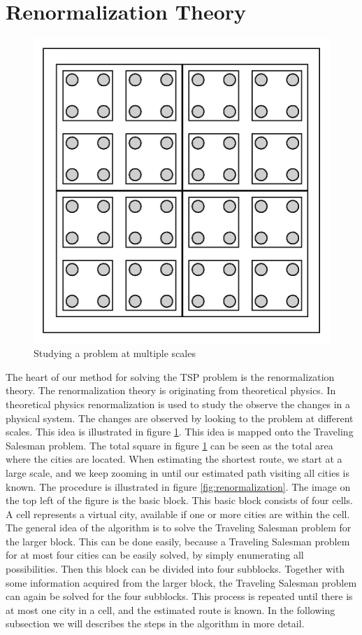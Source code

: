 \section{Renormalization Theory}
\begin{figure}[b]
\begin{center}
\includegraphics[scale=0.2]{fig/ising.png}
\caption{Studying a problem at multiple scales}
\label{fig:scales}
\end{center}
\end{figure}
The heart of our method for solving the TSP problem is the renormalization theory. The renormalization theory is originating from theoretical physics. In theoretical physics renormalization is used to study the observe the changes in a physical system. The changes are observed by looking to the problem at different scales. This idea is illustrated in figure \ref{fig:scales}.
\newline\newline\noindent
This idea is mapped onto the Traveling Salesman problem. The total square in figure \ref{fig:scales} can be seen as the total area where the cities are located. When estimating the shortest route, we start at a large scale, and we keep zooming in until our estimated path visiting all cities is known. The procedure is illustrated in figure \ref{fig:renormalization}. The image on the top left of the figure is the basic block. This basic block consists of four cells. A cell represents a virtual city, available if one or more cities are within the cell. The general idea of the algorithm is to solve the Traveling Salesman problem for the larger block. This can be done easily, because a Traveling Salesman problem for at most four cities can be easily solved, by simply enumerating all possibilities. Then this block can be divided into four subblocks. Together with some information acquired from the larger block, the Traveling Salesman problem can again be solved for the four subblocks. This process is repeated until there is at most one city in a cell, and the estimated route is known. In the following subsection we will describes the steps in the algorithm in more detail.
